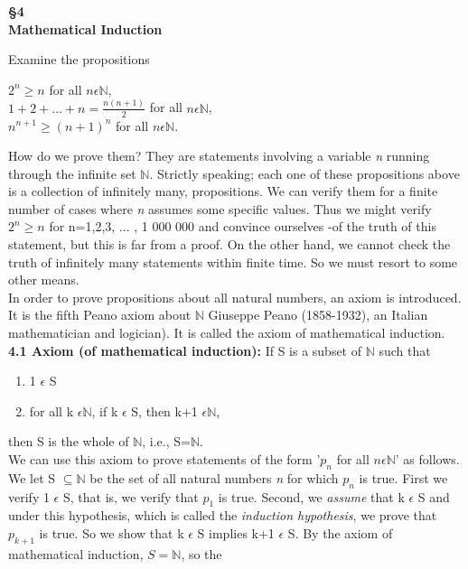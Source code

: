 \documentclass[11pts]{amsbook}
\begin{document}
\begin{center}
\textbf{{\LARGE{\S4}}} \\
\textbf{{\LARGE{Mathematical Induction}}} 
\end{center}
\noindent Examine the propositions
\begin{center}
$2^{n} \geq n$ for all $n \epsilon \mathbb{N}$, \\
$1+2+...+n=\frac{n(n+1)}{2} $ for all $n \epsilon \mathbb{N}$, \\
$n^{n+1} \geq (n+1)^{n}$ for all $n \epsilon \mathbb{N}$. \\
\end{center}
How do we prove them? They are statements involving a variable \textit{n} running through the infinite set $\mathbb{N}$. Strictly speaking; each one of these propositions above is a collection of infinitely many, propositions. We can verify them for a finite number of cases where \textit{n} assumes some specific values. Thus we might verify $2^{n}\geq n$ for n=1,2,3, ... , 1 000 000 and convince ourselves -of the truth of this statement, but this is far from a proof. On the other hand, we cannot check the truth of infinitely many statements within finite time. So we must resort to some other means.\\
\newline
In order to prove propositions about all natural numbers, an axiom is introduced. It is the fifth Peano axiom about $\mathbb{N}$ Giuseppe Peano (1858-1932), an Italian mathematician and logician). It is called the axiom of mathematical induction.\\
\newline
\textbf{4.1 Axiom (of mathematical induction):} If S is a subset of $\mathbb{N}$ such that \\

\begin{enumerate}[label=(\roman*)]
\item 1 $\epsilon$ S
\item for all k $\epsilon \mathbb{N}$, if k $\epsilon$ S, then k+1  $\epsilon \mathbb{N}$,
\end{enumerate}
then S is the whole of $\mathbb{N}$, i.e., S=$\mathbb{N}$. \\
\newline
We can use this axiom to prove statements of the form '$p_{n}$ for all $n \epsilon \mathbb{N}$' as follows. We let S $\subseteq \mathbb{N}$ be the set of all natural numbers \textit{n} for which $p_{n}$ is true. First we verify 1 $\epsilon$ S, that is, we verify that $p_{1}$ is true. Second, we \textit{assume} that 
 k $\epsilon$ S and under this hypothesis, which is called the  \textit{induction hypothesis}, we prove that $p_{k+1}$ is true. So we show that k $\epsilon$ S implies  k+1 $\epsilon$ S. By the axiom of mathematical induction, $S=\mathbb{N}$, so the
\end{document}
